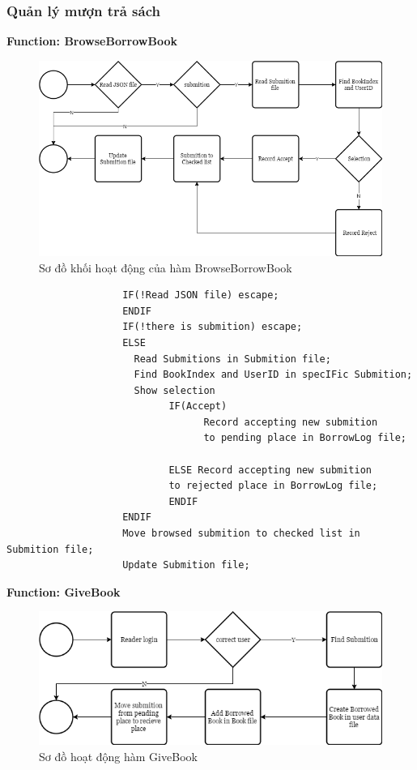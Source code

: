 \documentclass[12pt,a4paper]{report}
\begin{document}
            \subsubsection{Quản lý mượn trả sách}
                \textbf{Function: BrowseBorrowBook}
                \begin{figure}[H]
                    \centering
                    \label{F:browsebook}
                    \includegraphics[scale = .4]{browsebook.png}
                    \caption{Sơ đồ khối hoạt động của hàm BrowseBorrowBook}
                \end{figure}
                \begin{verbatim}
                    IF(!Read JSON file) escape;
                    ENDIF
                    IF(!there is submition) escape;
                    ELSE
                      Read Submitions in Submition file;
                      Find BookIndex and UserID in specIFic Submition;
                      Show selection
                            IF(Accept)
                                  Record accepting new submition 
                                  to pending place in BorrowLog file;

                            ELSE Record accepting new submition 
                            to rejected place in BorrowLog file;
                            ENDIF
                    ENDIF
                    Move browsed submition to checked list in Submition file;
                    Update Submition file;
                \end{verbatim}
                \textbf{Function: GiveBook}
                \begin{figure}[H]
                    \centering
                    \label{G:givebook}
                    \includegraphics[scale = .4]{givebook.png}
                    \caption{Sơ đồ hoạt động hàm GiveBook}
                \end{figure}
\end{document}
